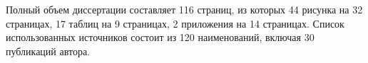 Полный объем диссертации составляет 116 страниц, из которых 44 рисунка на 32 страницах, 17 таблиц на 9 страницах, 2 приложения на 14 страницах. Список использованных источников состоит из 120 наименований, включая 30 публикаций автора.




%
